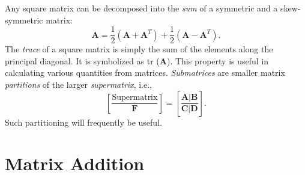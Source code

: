Any square matrix can be decomposed into the \emph{sum} of a symmetric and a skew-symmetric matrix:
\begin{equation}
\mathbf{A} = \frac{1}{2} (\mathbf{A} + \mathbf{A}^T) + \frac{1}{2} (\mathbf{A} - \mathbf{A}^T).
\end{equation}
The \emph{trace} of a square matrix is simply the sum of the elements along the principal diagonal. It 
is symbolized as tr ($\mathbf{A}$).
This property is useful in calculating various quantities from matrices. 
\emph{Submatrices} are smaller matrix \emph{partitions} of the larger \emph{supermatrix}, i.e.,
\begin{equation}
\left [ \frac{\mbox{Supermatrix}}{\mathbf{F}} \right] = \left[	\frac{\mathbf{A} | \mathbf{B}}{\mathbf{C} | \mathbf{D}} \right].
\end{equation}
Such partitioning will frequently be useful.
	 
\section{Matrix Addition}

